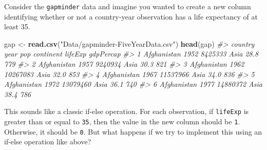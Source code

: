 \documentclass[]{book}
\newenvironment{Shaded}{\begin{snugshade}}{\end{snugshade}}
\newcommand{\CommentTok}[1]{\textcolor[rgb]{0.56,0.35,0.01}{\textit{#1}}}
\newcommand{\ControlFlowTok}[1]{\textcolor[rgb]{0.13,0.29,0.53}{\textbf{#1}}}
\newcommand{\DataTypeTok}[1]{\textcolor[rgb]{0.13,0.29,0.53}{#1}}
\newcommand{\DecValTok}[1]{\textcolor[rgb]{0.00,0.00,0.81}{#1}}
\newcommand{\KeywordTok}[1]{\textcolor[rgb]{0.13,0.29,0.53}{\textbf{#1}}}
\newcommand{\NormalTok}[1]{#1}
\newcommand{\OperatorTok}[1]{\textcolor[rgb]{0.81,0.36,0.00}{\textbf{#1}}}
\newcommand{\StringTok}[1]{\textcolor[rgb]{0.31,0.60,0.02}{#1}}
\begin{document}
Consider the \texttt{gapminder} data and imagine you wanted to create a new column identifying whether or not a country-year observation has a life expectancy of at least 35.

\begin{Shaded}
\begin{Highlighting}[]
\NormalTok{gap <-}\StringTok{ }\KeywordTok{read.csv}\NormalTok{(}\StringTok{"Data/gapminder-FiveYearData.csv"}\NormalTok{)}
\KeywordTok{head}\NormalTok{(gap)}
\CommentTok{#>       country year      pop continent lifeExp gdpPercap}
\CommentTok{#> 1 Afghanistan 1952  8425333      Asia    28.8       779}
\CommentTok{#> 2 Afghanistan 1957  9240934      Asia    30.3       821}
\CommentTok{#> 3 Afghanistan 1962 10267083      Asia    32.0       853}
\CommentTok{#> 4 Afghanistan 1967 11537966      Asia    34.0       836}
\CommentTok{#> 5 Afghanistan 1972 13079460      Asia    36.1       740}
\CommentTok{#> 6 Afghanistan 1977 14880372      Asia    38.4       786}
\end{Highlighting}
\end{Shaded}

This sounds like a classic if-else operation. For each observation, if \texttt{lifeExp} is greater than or equal to \texttt{35}, then the value in the new column should be \texttt{1}. Otherwise, it should be \texttt{0}. But what happens if we try to implement this using an if-else operation like above?

\begin{Shaded}
\end{Shaded}
\end{document}
